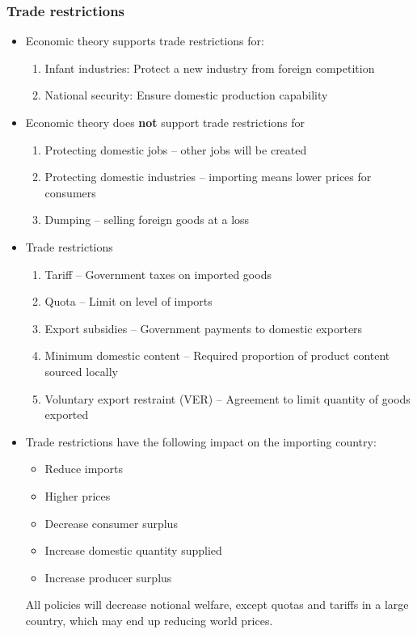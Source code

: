 \documentclass[../notes_compiled.tex]{subfiles}
\begin{document}
\subsubsection{Trade restrictions}
\begin{itemize}
\item Economic theory supports trade restrictions for:
\begin{enumerate}
\item Infant industries: Protect a new industry from foreign competition
\item National security: Ensure domestic production capability
\end{enumerate}
\item Economic theory does \textbf{not} support trade restrictions for
\begin{enumerate}
\item Protecting domestic jobs -- other jobs will be created
\item Protecting domestic industries -- importing means lower prices for consumers
\item Dumping -- selling foreign goods at a loss
\end{enumerate}
\item Trade restrictions
\begin{enumerate}
\item Tariff -- Government taxes on imported goods
\item Quota -- Limit on level of imports
\item Export subsidies -- Government payments to domestic exporters
\item Minimum domestic content -- Required proportion of product content sourced locally
\item Voluntary export restraint (VER) -- Agreement to limit quantity of goods exported
\end{enumerate}
\item Trade restrictions have the following impact on the importing country:
\begin{itemize}
\item Reduce imports
\item Higher prices
\item Decrease consumer surplus
\item Increase domestic quantity supplied
\item Increase producer surplus
\end{itemize}
All policies will decrease notional welfare, except quotas and tariffs in  a large country, which may end up reducing world prices.

\end{itemize}
\end{document}
